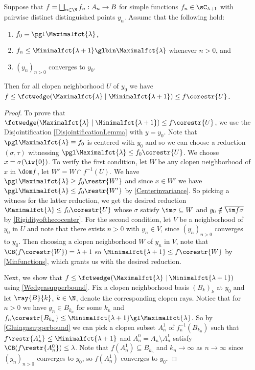 \begin{lemma}\label{Diagonalforlambda+1}
Suppose that $f=\bigsqcup_{n\in\N} f_n:A_n\to B$ for simple functions $f_n\in\sC_{\lambda+1}$ with pairwise distinct distinguished points $y_n$. Assume that the following hold: 
\begin{enumerate}
\item $f_0\equiv \pgl \Maximalfct{\lambda}$,
\item $f_n\leq \Minimalfct{\lambda+1}\glbin \Maximalfct{\lambda}$ whenever $n>0$, and
\item $(y_n)_{n>0}$ converges to $y_0$. 
\end{enumerate}
Then for all clopen neighborhood $U$ of $y_0$ we have $f\leq \fctwedge(\Maximalfct{\lambda}\mid \Minimalfct{\lambda+1})\leq f\corestr{U}$.
\end{lemma}
\begin{proof}
To prove that $\fctwedge(\Maximalfct{\lambda}\mid\Minimalfct{\lambda+1})\leq f\corestr{U}$, we use the Disjointification \cref{DisjointificationLemma} with $y=y_0$. Note that $\pgl\Maximalfct{\lambda}\equiv f_0$ is centered with \cocenter{} $y_0$ and so we can choose a reduction $(\sigma,\tau)$ witnessing $\pgl\Maximalfct{\lambda}\leq f_0\corestr{U}$. We choose $x=\sigma(\iw{0})$. To verify the first condition, let $W$ be any clopen neighborhood of $x$ in $\dom f$, let $W'=W\cap  f^{-1}(U)$. We have $\pgl\Maximalfct{\lambda}\geq f_0\restr{W'}$ and since $x\in W'$ we have $\pgl\Maximalfct{\lambda}\leq f_0\restr{W'}$ by \cref{Centerinvariance}. So picking a witness for the latter reduction, we get the desired reduction $\Maximalfct{\lambda}\leq f_0\corestr{U}$ whose $\sigma$ satisfy $\im \sigma \subseteq W$ and $y_0\notin \overline{\im f\sigma}$ by \cref{Rigidityofthecocenter}. 
For the second condition, let $V$ be a neighborhood of $y_0$ in $U$ and note that there exists $n>0$ with $y_n\in V$, since $(y_n)_{n>0}$ converges to $y_0$. Then choosing a clopen neighborhood $W$ of $y_n$ in $V$, note that $\CB(f\corestr{W})=\lambda+1$ so $\Minimalfct{\lambda+1}\leq f\corestr{W}$ by \cref{Minfunctions}, which grants us with the desired reduction.

Next, we show that $f\leq \fctwedge(\Maximalfct{\lambda}\mid\Minimalfct{\lambda+1})$ using \cref{Wedgeasupperbound}.
Fix a clopen neighborhood basis $(B_k)_k$ at $y_0$ and let $\ray{B}{k}$, $k\in \N$, denote the corresponding clopen rays.
Notice that for $n>0$ we have $y_n\in B_{k_n}$ for some $k_n$ and $f_n\corestr{B_{k_n}} \leq \Minimalfct{\lambda+1} \gl \Maximalfct{\lambda}$. So by \cref{Gluingasupperbound} we can pick a clopen subset $A^1_n$ of $f_n^{-1}(B_{k_n})$ such that $f\restr{A^1_n}\leq\Minimalfct{\lambda+1}$ and $A^0_n=A_n \setminus A^1_n$ satisfy $\CB(f\restr{A^0_n})\leq \lambda$. Note that $f(A^1_n)\subseteq B_{k_n}$ and $k_n\to \infty$ as $n\to \infty$ since $(y_n)_{n>0}$ converges to $y_0$, so $f(A^1_n)$ converges to $y_0$.


\end{proof}
